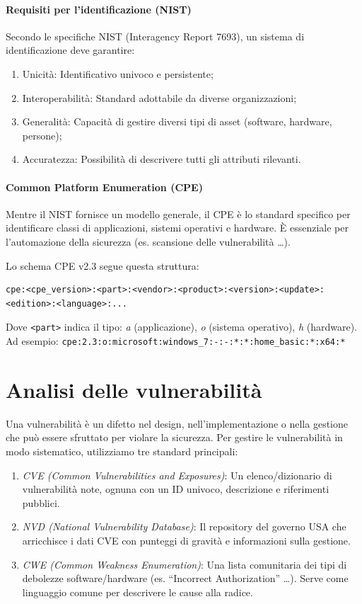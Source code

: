 \paragraph{Requisiti per l'identificazione (NIST)}
Secondo le specifiche NIST (Interagency Report 7693), un sistema di identificazione deve garantire:
\begin{enumerate}
    \item Unicità: Identificativo univoco e persistente;
    \item Interoperabilità: Standard adottabile da diverse organizzazioni;
    \item Generalità: Capacità di gestire diversi tipi di asset (software, hardware, persone);
    \item Accuratezza: Possibilità di descrivere tutti gli attributi rilevanti.
\end{enumerate}
%
\paragraph{Common Platform Enumeration (CPE)} Mentre il NIST fornisce un modello generale, il CPE è lo standard specifico per identificare classi di applicazioni, sistemi operativi e hardware. È essenziale per l'automazione della sicurezza (es. scansione delle vulnerabilità \dots).

Lo schema CPE v2.3 segue questa struttura:
\begin{lstlisting}[style=CPE]
    cpe:<cpe_version>:<part>:<vendor>:<product>:<version>:<update>:<edition>:<language>:...
\end{lstlisting}

Dove \lstinline[style=CPE]|<part>| indica il tipo: \emph{a} (applicazione), \emph{o} (sistema operativo), \emph{h} (hardware).
Ad esempio: \lstinline[style=CPE]|cpe:2.3:o:microsoft:windows_7:-:-:*:*:home_basic:*:x64:*|

%
\section{Analisi delle vulnerabilità}
Una vulnerabilità è un difetto nel design, nell'implementazione o nella gestione che può essere sfruttato per violare la sicurezza. Per gestire le vulnerabilità in modo sistematico, utilizziamo tre standard principali:
\begin{enumerate}
    \item \emph{CVE (Common Vulnerabilities and Exposures)}: Un elenco/dizionario di vulnerabilità note, ognuna con un ID univoco, descrizione e riferimenti pubblici.
    \item \emph{NVD (National Vulnerability Database)}: Il repository del governo USA che arricchisce i dati CVE con punteggi di gravità e informazioni sulla gestione.
    \item \emph{CWE (Common Weakness Enumeration)}: Una lista comunitaria dei tipi di debolezze software/hardware (es. ``Incorrect Authorization'' \dots). Serve come linguaggio comune per descrivere le cause alla radice.
\end{enumerate}

